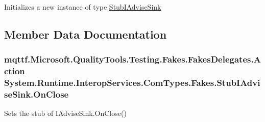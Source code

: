 Initializes a new instance of type \hyperlink{class_system_1_1_runtime_1_1_interop_services_1_1_com_types_1_1_fakes_1_1_stub_i_advise_sink}{Stub\-I\-Advise\-Sink}



\subsection{Member Data Documentation}
\hypertarget{class_system_1_1_runtime_1_1_interop_services_1_1_com_types_1_1_fakes_1_1_stub_i_advise_sink_ae57b23b9232a56b577850a08fd20fa62}{
\subsubsection[{On\-Close}]{\setlength{\rightskip}{0pt plus 5cm}mqttf.\-Microsoft.\-Quality\-Tools.\-Testing.\-Fakes.\-Fakes\-Delegates.\-Action System.\-Runtime.\-Interop\-Services.\-Com\-Types.\-Fakes.\-Stub\-I\-Advise\-Sink.\-On\-Close}}\label{class_system_1_1_runtime_1_1_interop_services_1_1_com_types_1_1_fakes_1_1_stub_i_advise_sink_ae57b23b9232a56b577850a08fd20fa62}


Sets the stub of I\-Advise\-Sink.\-On\-Close()

